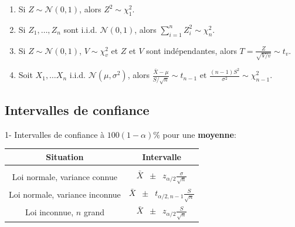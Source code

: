 \documentclass[12pt,french]{article}
\begin{document}
\begin{enumerate}
\item[$\bullet$] Si $Z \sim \mathcal{N}(0,1)$, alors $Z^2 \sim \chi^2_1$. 
\item[$\bullet$] Si $Z_1, \ldots, Z_n$ sont i.i.d. $\mathcal{N}(0,1)$, alors $\sum_{i=1}^n Z_i^2 \sim \chi^2_n$.
\item[$\bullet$] Si $Z \sim \mathcal{N}(0,1)$, $V \sim \chi^2_v$ et $Z$ et $V$ sont indépendantes, alors $ T = \frac{Z}{\sqrt{V/v}} \sim t_v$.
\item[$\bullet$] Soit $X_1, \ldots X_n$  i.i.d. $\mathcal{N}(\mu, \sigma^2)$, alors  $\frac{\bar{X} - \mu}{S / \sqrt{n}} \sim t_{n-1} \mbox{   et } \frac{(n-1)S^2}{\sigma^2} \sim \chi^2_{n-1}.$
\end{enumerate}



\subsection*{Intervalles de confiance}

1- Intervalles de confiance \`a $100(1-\alpha)\%$ pour une \textbf{moyenne}:

\begin{table}[h!]
\begin{center}
\begin{tabular}{|c||c|}
\hline
Situation & Intervalle \\[4pt]
\hline
& \\[-12pt]
Loi normale, variance connue & {\large $ \bar{X} \; \; \pm \; \; z_{\alpha/2}\frac{\sigma}{\sqrt{n}}$ }
\\[8pt]
Loi normale, variance inconnue & {\large $\bar{X} \; \; \pm \; \; t_{\alpha/2, n-1}\frac{S}{\sqrt{n}}$}
\\[8pt]
Loi inconnue, $n$ grand & {\large $\bar{X} \; \; \pm \; \; z_{\alpha/2}\frac{S}{\sqrt{n}}$ }\\[8pt]
\hline
\end{tabular}
\end{center}
\end{table}
\end{document}

